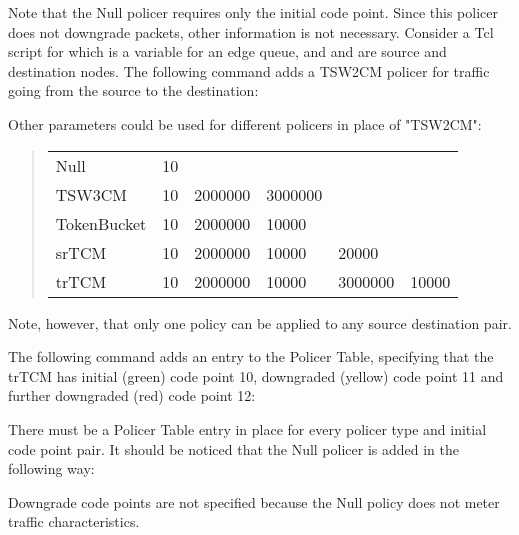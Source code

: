 Note that the Null policer requires only the initial code point. Since
this policer does not downgrade packets, other information is not necessary.  
Consider a Tcl script for which 
   is a variable for an edge queue, 
  and  and  are source and destination nodes.   
The following command adds a TSW2CM policer for traffic going from 
  the source to the destination:


Other parameters could be used for different policers 
  in place of "TSW2CM":

\begin{quote}
\begin{tabular}{llllll}
Null&10\\
TSW3CM&10&2000000&3000000\\
TokenBucket&10&2000000&10000\\
srTCM&10&2000000&10000&20000\\
trTCM&10&2000000&10000&3000000&10000
\end{tabular}
\end{quote}

Note, however, 
  that only one policy can be applied to any source destination pair.

The following command adds an entry to the Policer Table, 
  specifying that the trTCM has
  initial (green) code point 10, downgraded (yellow) code point 11 
  and further downgraded (red) code point 12:


There must be a Policer Table entry in place for every 
policer type and initial code point pair.
It should be noticed that the Null policer is added in the following way:


Downgrade code points are not specified because the Null policy does not
meter traffic characteristics.


